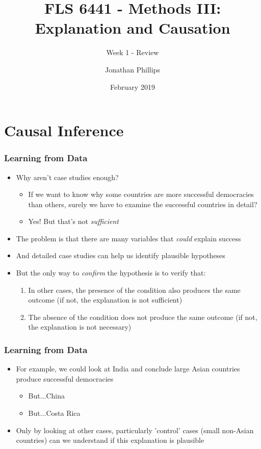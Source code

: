 \documentclass[xcolor=x11names,compress]{beamer}\usepackage[]{graphicx}\usepackage[]{color}
\title{FLS 6441 - Methods III: Explanation and Causation}
\subtitle{Week 1 - Review}
\author{Jonathan Phillips}
\date{February 2019}
\renewcommand{\(}{\begin{columns}}
\renewcommand{\)}{\end{columns}}
\newcommand{\<}[1]{\begin{column}{#1}}
\renewcommand{\>}{\end{column}}
\begin{document}
\frame{\titlepage}

\section{Causal Inference}

\begin{frame}
\frametitle{Learning from Data}
\begin{itemize}
\item Why aren't case studies enough?
\pause
\begin{itemize}
\item If we want to know why some countries are more successful democracies than others, surely we have to examine the successful countries in detail?
\pause
\item Yes! But that's not \textit{sufficient}
\pause
\end{itemize}
\item The problem is that there are many variables that \textit{could} explain success
\pause
\item And detailed case studies can help us identify plausible hypotheses
\pause
\item But the only way to \textit{confirm} the hypothesis is to verify that:
\pause
\begin{enumerate}
\item In other cases, the presence of the condition also produces the same outcome (if not, the explanation is not sufficient)
\pause
\item The absence of the condition does not produce the same outcome (if not, the explanation is not necessary)
\end{enumerate}
\end{itemize}
\end{frame}

\begin{frame}
\frametitle{Learning from Data}
\begin{itemize}
\item For example, we could look at India and conclude large Asian countries produce successful democracies
\pause
\begin{itemize}
\item But...China
\pause
\item But...Costa Rica
\pause
\end{itemize}
\item Only by looking at other cases, particularly 'control' cases (small non-Asian countries) can we understand if this explanation is plausible
\end{itemize}
\end{frame}
\end{document}
